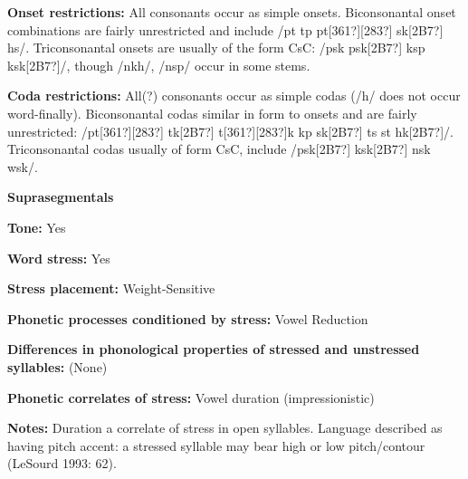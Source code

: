 \begin{styleBody}
\textbf{Onset restrictions:} All consonants occur as simple onsets. Biconsonantal onset combinations are fairly unrestricted and include /pt tp pt[361?][283?] sk[2B7?] hs/. Triconsonantal onsets are usually of the form CsC: /psk psk[2B7?] ksp ksk[2B7?]/, though /nkh/, /nsp/ occur in some stems.
\end{styleBody}

\begin{styleBody}
\textbf{Coda restrictions: }All(?) consonants occur as simple codas (/h/ does not occur word-finally). Biconsonantal codas similar in form to onsets and are fairly unrestricted: /pt[361?][283?] tk[2B7?] t[361?][283?]k kp sk[2B7?] ts st hk[2B7?]/. Triconsonantal codas usually of form CsC, include /psk[2B7?] ksk[2B7?] nsk wsk/.
\end{styleBody}

\begin{styleBody}
\textbf{Suprasegmentals}
\end{styleBody}

\begin{styleBody}
\textbf{Tone:} Yes
\end{styleBody}

\begin{styleBody}
\textbf{Word stress:} Yes
\end{styleBody}

\begin{styleBody}
\textbf{Stress placement:} Weight-Sensitive
\end{styleBody}

\begin{styleBody}
\textbf{Phonetic processes conditioned by stress:} Vowel Reduction
\end{styleBody}

\begin{styleBody}
\textbf{Differences in phonological properties of stressed and unstressed syllables:} (None)
\end{styleBody}

\begin{styleBody}
\textbf{Phonetic correlates of stress: }Vowel duration (impressionistic)
\end{styleBody}

\begin{styleBody}
\textbf{Notes: }Duration a correlate of stress in open syllables. Language described as having pitch accent: a stressed syllable may bear high or low pitch/contour (LeSourd 1993: 62).
\end{styleBody}

